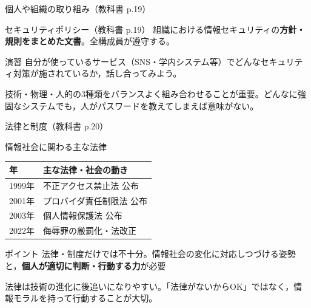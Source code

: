 \documentclass[aspectratio=43,professionalfonts,handout,10pt]{beamer}
\begin{document}
\begin{frame}{個人や組織の取り組み（教科書 p.19）}

  \vfill

  \begin{block}{セキュリティポリシー（教科書 p.19）}
    \small 組織における情報セキュリティの\textbf{方針・規則をまとめた文書}。全構成員が遵守する。
  \end{block}

  \begin{exampleblock}{演習}
    自分が使っているサービス（SNS・学内システム等）でどんなセキュリティ対策が施されているか，話し合ってみよう。
  \end{exampleblock}

  \begin{slidenote}
    技術・物理・人的の3種類をバランスよく組み合わせることが重要。どんなに強固なシステムでも，人がパスワードを教えてしまえば意味がない。
  \end{slidenote}
\end{frame}


\begin{frame}{法律と制度（教科書 p.20）}
  \begin{block}{情報社会に関わる主な法律}
    \small
    \begin{tabular}{ll}
      \toprule
      年 & 主な法律・社会の動き \\
      \midrule
      1999年 & 不正アクセス禁止法 公布 \\
      2001年 & プロバイダ責任制限法 公布 \\
      2003年 & 個人情報保護法 公布 \\
      2022年 & 侮辱罪の厳罰化・法改正 \\
      \bottomrule
    \end{tabular}
  \end{block}

  \vfill

  \begin{alertblock}{ポイント}
    法律・制度だけでは不十分。情報社会の変化に対応しつづける姿勢と，\textbf{個人が適切に判断・行動する力}が必要
  \end{alertblock}

  \begin{slidenote}
    法律は技術の進化に後追いになりやすい。「法律がないからOK」ではなく，情報モラルを持って行動することが大切。
  \end{slidenote}
\end{frame}
\end{document}
